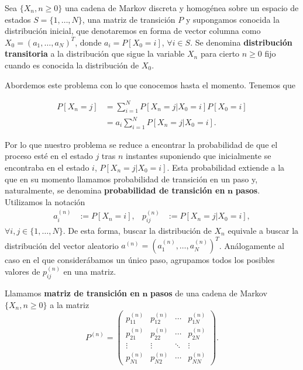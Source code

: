 Sea $\{X_n, n\geq 0\}$ una cadena de Markov discreta y homogénea sobre un espacio de estados $S=\{1,\dots,N\}$, una matriz de transición $P$ y supongamos conocida la distribución inicial, que denotaremos en forma de vector columna como $X_0 = (a_1, \dots, a_N)^T$, donde $a_i = P[X_0 = i]$, $\forall i \in S$. Se denomina \textbf{distribución transitoria} a la distribución que sigue la variable $X_n$ para cierto $n\geq 0$ fijo cuando es conocida la distribución de $X_0$.

Abordemos este problema con lo que conocemos hasta el momento. Tenemos que

\begin{equation}
    \label{eq:distr-trans}
    \begin{split}
        P[X_n = j] &= \sum_{i=1}^N P[X_n=j|X_0 = i]P[X_0=i] \\
        &= a_i \sum_{i=1}^N P[X_n=j|X_0 = i].
    \end{split}
\end{equation}

Por lo que nuestro problema se reduce a encontrar la probabilidad de que el proceso esté en el estado $j$ tras $n$ instantes suponiendo que inicialmente se encontraba en el estado $i$, $P[X_n=j|X_0 = i]$. Esta probabilidad extiende a la que en su momento llamamos probabilidad de transición en un paso y, naturalmente, se denomina \textbf{probabilidad de transición en }$\mathbf{n}$ \textbf{pasos}. Utilizamos la notación  
\begin{align*}
    a_i^{(n)} &:= P[X_n=i], & p_{ij}^{(n)} &:= P[X_{n}=j|X_0=i],
\end{align*}
$\forall i,j \in \{1,\dots,N\}$. De esta forma, buscar la distribución de $X_n$ equivale a buscar la distribución del vector aleatorio $a^{(n)}=(a_1^{(n)},\dots,a_N^{(n)})^T$. Análogamente al caso en el que considerábamos un único paso, agrupamos todos los posibles valores de $p_{ij}^{(n)}$ en una matriz.

\begin{definicion}
    Llamamos \textbf{matriz de transición en }$\mathbf{n}$ \textbf{pasos} de una cadena de Markov $\{X_n, n\geq 0\}$ a la matriz
    \begin{equation}
        \label{eq:matriz-trans-n}
        P^{(n)}=\begin{pmatrix}
          p_{11}^{(n)} & p_{12}^{(n)} & \cdots & p_{1N}^{(n)} \\
          p_{21}^{(n)} & p_{22}^{(n)} & \cdots & p_{2N}^{(n)} \\
          \vdots & \vdots & \ddots & \vdots \\
          p_{N1}^{(n)} & p_{N2}^{(n)} & \cdots & p_{NN}^{(n)}  
        \end{pmatrix}.
    \end{equation}
\end{definicion}

